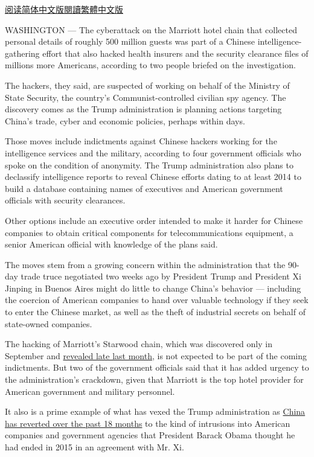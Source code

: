 \href{https://cn.nytimes.com/usa/20181212/trump-china-trade/}{阅读简体中文版}\href{https://cn.nytimes.com/usa/20181212/trump-china-trade/zh-hant/}{閱讀繁體中文版}

WASHINGTON --- The cyberattack on the Marriott hotel chain that
collected personal details of roughly 500 million guests was part of a
Chinese intelligence-gathering effort that also hacked health insurers
and the security clearance files of millions more Americans, according
to two people briefed on the investigation.

The hackers, they said, are suspected of working on behalf of the
Ministry of State Security, the country's Communist-controlled civilian
spy agency. The discovery comes as the Trump administration is planning
actions targeting China's trade, cyber and economic policies, perhaps
within days.

Those moves include indictments against Chinese hackers working for the
intelligence services and the military, according to four government
officials who spoke on the condition of anonymity. The Trump
administration also plans to declassify intelligence reports to reveal
Chinese efforts dating to at least 2014 to build a database containing
names of executives and American government officials with security
clearances.

Other options include an executive order intended to make it harder for
Chinese companies to obtain critical components for telecommunications
equipment, a senior American official with knowledge of the plans said.

The moves stem from a growing concern within the administration that the
90-day trade truce negotiated two weeks ago by President Trump and
President Xi Jinping in Buenos Aires might do little to change China's
behavior --- including the coercion of American companies to hand over
valuable technology if they seek to enter the Chinese market, as well as
the theft of industrial secrets on behalf of state-owned companies.

The hacking of Marriott's Starwood chain, which was discovered only in
September and
\href{https://www.nytimes.com/2018/11/30/business/marriott-data-breach.html}{revealed
late last month}, is not expected to be part of the coming indictments.
But two of the government officials said that it has added urgency to
the administration's crackdown, given that Marriott is the top hotel
provider for American government and military personnel.

It also is a prime example of what has vexed the Trump administration as
\href{https://www.nytimes.com/2018/11/29/us/politics/china-trump-cyberespionage.html}{China
has reverted over the past 18 months} to the kind of intrusions into
American companies and government agencies that President Barack Obama
thought he had ended in 2015 in an agreement with Mr. Xi.

